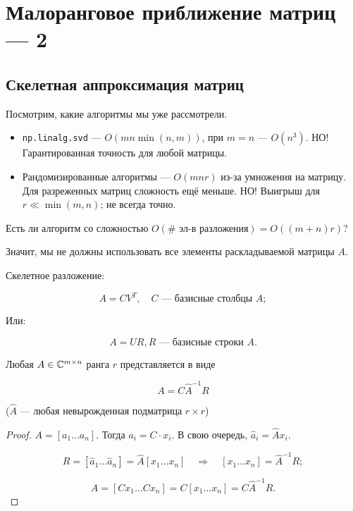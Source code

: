 \section{Малоранговое приближение матриц --- 2}

\subsection{Скелетная аппроксимация матриц}

Посмотрим, какие алгоритмы мы уже рассмотрели.

\begin{itemize}
    \item \verb|np.linalg.svd| --- $O(m n \min(n, m))$, при $m = n$ ---
        $O(n^3)$. НО! Гарантированная точность для любой матрицы.
    \item Рандомизированные алгоритмы --- $O(m n r)$ из-за умножения на матрицу.
        Для разреженных матриц сложность ещё меньше. НО! Выигрыш для
        $r \ll \min(m, n)$; не всегда точно.
\end{itemize}

Есть ли алгоритм со сложностью $O(\#\text{ эл-в разложения}) = O((m + n) r)$?

Значит, мы не должны использовать все элементы раскладываемой матрицы $A$.

Скелетное разложение:

\[
    A = C V^T, \quad C \text{ --- базисные столбцы } A;
\]

\begin{center}
    Или:
\end{center}

\[
    A = U R, R \text{ --- базисные строки } A.
\]

\begin{theorem}
    Любая $A \in \mathbb{C}^{m \times n}$ ранга $r$ представляется в виде

    \[
        A = C \hat{A}^{-1} R
    \]
\end{theorem}

($\hat{A}$ --- любая невырожденная подматрица $r \times r$)

\begin{proof}
    $A = [a_1 \dots a_n]$. Тогда $a_i = C \cdot x_i$. В свою очередь,
    $\hat{a}_i = \hat{A} x_i$.

    \[
        R = [\hat{a}_1 \dots \hat{a}_n] = \hat{A} [x_1 \dots x_n]
        \quad\Rightarrow\quad [x_1 \dots x_n] = \hat{A}^{-1} R;
    \]

    \[
        A = [C x_1 \dots C x_n] = C [x_1 \dots x_n] = C \hat{A}^{-1} R.
    \]
\end{proof}

